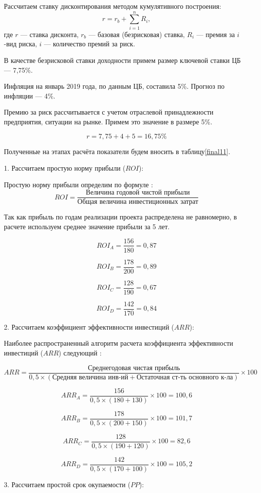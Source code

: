 Рассчитаем ставку дисконтирования методом кумулятивного построения:
\[ r = r_b + \sum\limits_{i=1}^{n} R_i, \]
где  $r$ --- ставка дисконта,
$r_b$ --- базовая (безрисковая) ставка,
$R_i$ --- премия за $i$-вид риска,
$i$ --- количество премий за риск.

В качестве безрисковой ставки доходности примем размер ключевой ставки ЦБ --- 7,75\%. 

Инфляция на январь 2019 года, по данным ЦБ, составила 5\%. Прогноз по инфляции --- 4\%.

Премию за риск рассчитывается с учетом отраслевой принадлежности предприятия, ситуации на рынке. Примем это значение в размере 5\%.

\[ r = 7,75  + 4 + 5 = 16,75 \%\]

Полученные на этапах расчёта показатели будем вносить в таблицу\ref{final11}.

1. Рассчитаем простую норму прибыли ($ROI$):

Простую норму прибыли определим по формуле \cite[174]{sergeev}:
\[ ROI = \dfrac{\text{Величина годовой чистой прибыли}}{\text{Общая величина инвестиционных затрат}}\]

Так как прибыль по годам реализации проекта распределена не равномерно, в расчете используем среднее значение прибыли за 5 лет.

\[ ROI_A = \dfrac{156}{180} = 0,87\]

\[ ROI_B = \dfrac{178}{200}=0,89\]

\[ ROI_C = \dfrac{128}{190}=0,67\]

\[ ROI_D =  \dfrac{142}{170}=0,84\]

2. Рассчитаем коэффициент эффективности инвестиций ($ARR$):

Наиболее распространенный алгоритм расчета коэффициента эффективности инвестиций ($ARR$) следующий \cite[214]{leontev}:

\[ ARR = \dfrac{\text{Среднегодовая чистая прибыль}}{0,5 \times (\text{Средняя величина инв-ий} + \text{Остаточная ст-ть основного к-ла})} \times 100 \]

\[ ARR_A =  \dfrac{156}{0,5 \times (180 + 130)} \times 100 =100,6\]

\[ ARR_B =   \dfrac{178}{0,5 \times (200 + 150)} \times 100 =101,7\]

\[ ARR_C =  \dfrac{128}{0,5 \times (190 + 120)} \times 100 =82,6\]

\[ ARR_D =  \dfrac{142}{0,5 \times (170 + 100)} \times 100 =105,2\]

3. Рассчитаем простой срок окупаемости ($PP$):

